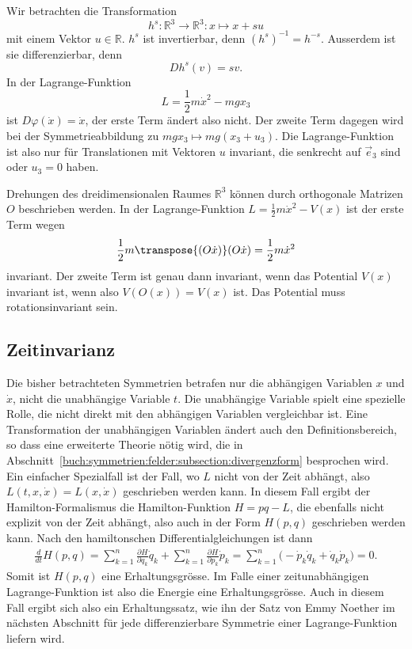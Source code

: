 \begin{beispiel}
\label{buch:symmetrien:symmetrie:beispiel:homogen}
Wir betrachten die Transformation
\[
h^s
\colon
\mathbb{R}^3 \to \mathbb{R}^3
:
x \mapsto x + su
\]
mit einem Vektor $u\in\mathbb{R}$.
$h^s$ ist invertierbar, denn $(h^s)^{-1}=h^{-s}$.
Ausserdem ist sie differenzierbar, denn
\[
Dh^s(v)
=
sv.
\]
In der Lagrange-Funktion
\[
L
=
\frac12m\dot{x}^2 - mgx_3
\]
ist $D\varphi(\dot{x})=\dot{x}$, der erste Term ändert also nicht.
Der zweite Term dagegen wird bei der Symmetrieabbildung zu
$mgx_3\mapsto mg(x_3+u_3)$.
Die Lagrange-Funktion ist also nur für Translationen mit Vektoren $u$
invariant, die senkrecht auf $\vec{e}_3$ sind oder $u_3=0$ haben.
\end{beispiel}

\begin{beispiel}
\label{buch:symmetrien:symmetrie:beispiel:drehung}
Drehungen des dreidimensionalen Raumes $\mathbb{R}^3$ können durch
orthogonale Matrizen $O$ beschrieben werden.
In der Lagrange-Funktion $L=\frac12m\dot{x}^2-V(x)$ ist der erste
Term wegen
\[
\frac12m \transpose{(O\dot{x})}(O\dot{x})
=
\frac12m\dot{x}^2
\]
invariant.
Der zweite Term ist genau dann invariant, wenn das Potential $V(x)$
invariant ist, wenn also $V(O(x))=V(x)$ ist.
Das Potential muss rotationsinvariant sein.
\end{beispiel}

%
%
\subsection{Zeitinvarianz}
%
Die bisher betrachteten Symmetrien betrafen nur die abhängigen
Variablen $x$ und $\dot{x}$, nicht die unabhängige Variable $t$.
Die unabhängige Variable spielt eine spezielle Rolle, die nicht
direkt mit den abhängigen Variablen vergleichbar ist.
Eine Transformation der unabhängigen Variablen ändert auch den
Definitionsbereich, so dass eine erweiterte Theorie nötig wird, 
die in Abschnitt~\ref{buch:symmetrien:felder:subsection:divergenzform}
besprochen wird.
Ein einfacher Spezialfall ist der Fall, wo $L$ nicht von der
Zeit abhängt, also $L(t,x,\dot{x})=L(x,\dot{x})$ geschrieben werden
kann.
In diesem Fall ergibt der Hamilton-Formalismus die Hamilton-Funktion
$H=pq-L$, die ebenfalls nicht explizit von der Zeit abhängt, also
auch in der Form $H(p,q)$ geschrieben werden kann.
Nach den hamiltonschen Differentialgleichungen ist dann
\begin{align*}
\frac{d}{dt}H(p,q)
=
\sum_{k=1}^n
\frac{\partial H}{\partial q_k}\dot{q}_k
+
\sum_{k=1}^n
\frac{\partial H}{\partial p_k}\dot{p}_k
=
\sum_{k=1}^n
\bigl(
-
\dot{p}_k\dot{q}_k
+
\dot{q}_k\dot{p}_k
\bigr)
=
0.
\end{align*}
Somit ist $H(p,q)$ eine Erhaltungsgrösse.
Im Falle einer zeitunabhängigen Lagrange-Funk\-tion ist also die
Energie eine Erhaltungsgrösse.
%
Auch in diesem Fall ergibt sich also ein Erhaltungssatz, wie ihn
der Satz von Emmy Noether im nächsten Abschnitt für jede differenzierbare
Symmetrie einer Lagrange-Funktion liefern wird.

